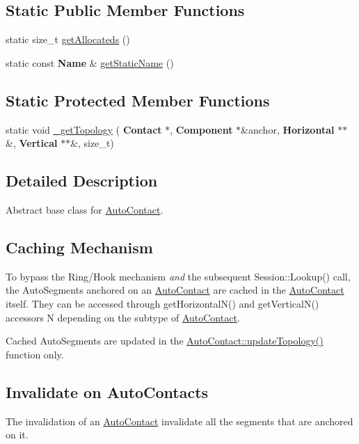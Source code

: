 \subsection*{Static Public Member Functions}
\begin{DoxyCompactItemize}
\item 
static size\+\_\+t \mbox{\hyperlink{classKatabatic_1_1AutoContact_a91c8bc1a6bdb1b15c3c084ebfd38af47}{get\+Allocateds}} ()
\item 
static const \textbf{ Name} \& \mbox{\hyperlink{classKatabatic_1_1AutoContact_a00e56270cfb31f56e52e31afbc33ba71}{get\+Static\+Name}} ()
\end{DoxyCompactItemize}
\subsection*{Static Protected Member Functions}
\begin{DoxyCompactItemize}
\item 
static void \mbox{\hyperlink{classKatabatic_1_1AutoContact_a2294ddd6bd4bda59c3453cc4dbd4f4fa}{\+\_\+get\+Topology}} (\textbf{ Contact} $\ast$, \textbf{ Component} $\ast$\&anchor, \textbf{ Horizontal} $\ast$$\ast$\&, \textbf{ Vertical} $\ast$$\ast$\&, size\+\_\+t)
\end{DoxyCompactItemize}


\subsection{Detailed Description}
Abstract base class for \mbox{\hyperlink{classKatabatic_1_1AutoContact}{Auto\+Contact}}. 

\hypertarget{classKatabatic_1_1AutoContact_secACCache}{}\subsection{Caching Mechanism}\label{classKatabatic_1_1AutoContact_secACCache}
To bypass the Ring/\+Hook mechanism {\itshape and} the subsequent Session\+::\+Lookup() call, the Auto\+Segments anchored on an \mbox{\hyperlink{classKatabatic_1_1AutoContact}{Auto\+Contact}} are cached in the \mbox{\hyperlink{classKatabatic_1_1AutoContact}{Auto\+Contact}} itself. They can be accessed through {\ttfamily get\+Horizontal\+N()} and get\+Vertical\+N() accessors {\ttfamily N} depending on the subtype of \mbox{\hyperlink{classKatabatic_1_1AutoContact}{Auto\+Contact}}.

Cached Auto\+Segments are updated in the \mbox{\hyperlink{classKatabatic_1_1AutoContact_a690764ddc997fe9766a79c4b8e0c3e2f}{Auto\+Contact\+::update\+Topology()}} function only.\hypertarget{classKatabatic_1_1AutoContact_secACInvalidate}{}\subsection{Invalidate on Auto\+Contacts}\label{classKatabatic_1_1AutoContact_secACInvalidate}
The invalidation of an \mbox{\hyperlink{classKatabatic_1_1AutoContact}{Auto\+Contact}} invalidate all the segments that are anchored on it.

